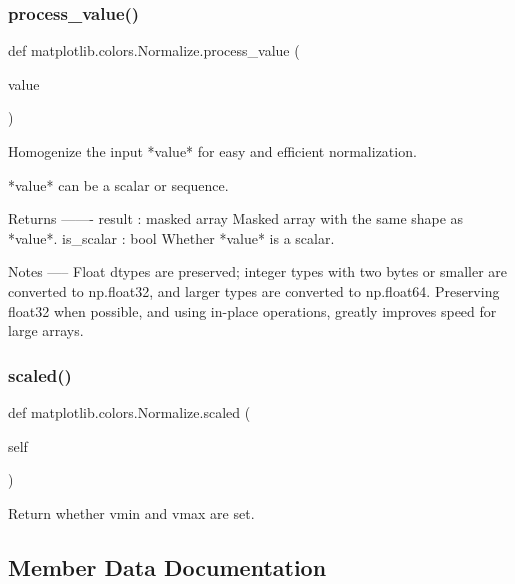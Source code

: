 \subsubsection{\texorpdfstring{process\+\_\+value()}{process\_value()}}
{\footnotesize\ttfamily def matplotlib.\+colors.\+Normalize.\+process\+\_\+value (\begin{DoxyParamCaption}\item[{}]{value }\end{DoxyParamCaption})\hspace{0.3cm}{\ttfamily [static]}}

\begin{DoxyVerb}Homogenize the input *value* for easy and efficient normalization.

*value* can be a scalar or sequence.

Returns
-------
result : masked array
    Masked array with the same shape as *value*.
is_scalar : bool
    Whether *value* is a scalar.

Notes
-----
Float dtypes are preserved; integer types with two bytes or smaller are
converted to np.float32, and larger types are converted to np.float64.
Preserving float32 when possible, and using in-place operations,
greatly improves speed for large arrays.
\end{DoxyVerb}
 \mbox{\label{classmatplotlib_1_1colors_1_1Normalize_af6a4ef7fe23e5c00dbecad43c813061e}} 
\subsubsection{\texorpdfstring{scaled()}{scaled()}}
{\footnotesize\ttfamily def matplotlib.\+colors.\+Normalize.\+scaled (\begin{DoxyParamCaption}\item[{}]{self }\end{DoxyParamCaption})}

\begin{DoxyVerb}Return whether vmin and vmax are set.\end{DoxyVerb}
 

\subsection{Member Data Documentation}
\mbox{\label{classmatplotlib_1_1colors_1_1Normalize_a7355c143b0fcdd0ec9998c02e2962a8b}} 
